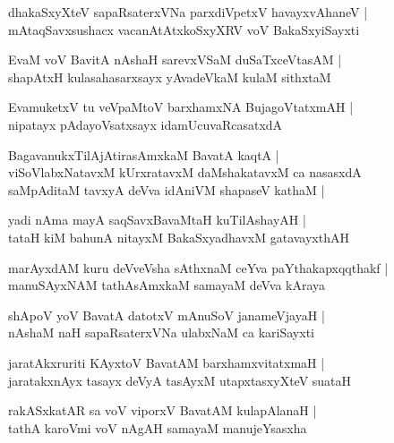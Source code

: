 \begin{shloka}
dhakaSxyXteV sapaRsaterxVNa parxdiVpetxV havayxvAhaneV |\\ mAtaqSavxsushacx vacanAtAtxkoSxyXRV voV BakaSxyiSayxti
\end{shloka}

\begin{shloka}
EvaM voV BavitA nAshaH sarevxVSaM duSaTxceVtasAM |\\ shapAtxH kulasahasarxsayx yAvadeVkaM kulaM sithxtaM
\end{shloka}

\begin{shloka}
EvamuketxV tu veVpaMtoV barxhamxNA BujagoVtatxmAH |\\ nipatayx pAdayoVsatxsayx idamUcuvaRcasatxdA
\end{shloka}

\begin{shloka}
BagavanukxTilAjAtirasAmxkaM BavatA kaqtA |\\ viSoVlabxNatavxM kUrxratavxM daMshakatavxM ca nasasxdA \\ saMpAditaM tavxyA deVva idAniVM shapaseV kathaM |
\end{shloka}

\begin{shloka}
yadi nAma mayA saqSavxBavaMtaH kuTilAshayAH |\\ tataH kiM bahunA nitayxM BakaSxyadhavxM gatavayxthAH
\end{shloka}

\begin{shloka}
marAyxdAM kuru deVveVsha sAthxnaM ceYva paYthakapxqqthakf |\\
manuSAyxNAM tathAsAmxkaM samayaM deVva kAraya
\end{shloka}

\begin{shloka}
shApoV yoV BavatA datotxV mAnuSoV janameVjayaH |\\
nAshaM naH sapaRsaterxVNa ulabxNaM ca kariSayxti
\end{shloka}

\begin{shloka}
jaratAkxruriti KAyxtoV BavatAM barxhamxvitatxmaH |\\
jaratakxnAyx tasayx deVyA tasAyxM utapxtasxyXteV suataH 
\end{shloka}

\begin{shloka}
rakASxkatAR sa voV viporxV BavatAM kulapAlanaH |\\
tathA karoVmi voV nAgAH samayaM manujeYsasxha
\end{shloka}

